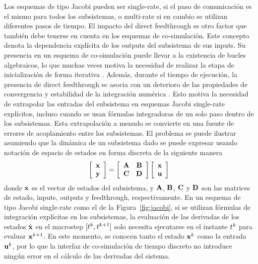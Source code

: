 Los esquemas de tipo Jacobi pueden ser single-rate, si el paso de comunicación es el mismo para todos los subsistemas, o multi-rate si en cambio se utilizan diferentes pasos de tiempo.
El impacto del direct feedthrough es otro factor que también debe tenerse en cuenta en los esquemas de co-simulación.
Este concepto denota la dependencia explícita de los outputs del subsistema de sus inputs.
Su presencia en un esquema de co-simulación puede llevar a la existencia de bucles algebraicos, lo que muchas veces motiva la necesidad de realizar la etapa de inicialización de forma iterativa \cite{Andersson2016}.
Además, durante el tiempo de ejecución, la presencia de direct feedthrough se asocia con un deterioro de las propiedades de convergencia y estabilidad de la integración numérica \cite{Arnold2013}.
Esto motiva la necesidad de extrapolar las entradas del subsistema en esquemas Jacobi single-rate explícitos, incluso cuando se usan fórmulas integradoras de un solo paso dentro de los subsistemas.
Esta extrapolación a menudo se convierte en una fuente de errores de acoplamiento entre los subsistemas.
El problema se puede ilustrar asumiendo que la dinámica de un subsistema dado se puede expresar usando notación de espacio de estados en forma discreta de la siguiente manera
%
\begin{equation}
	\sqbr{\matr{c}{\state \\ \outputs}} = \sqbr{\matr{cc}{\stateMatrix & \inputMatrix \\ \outputMatrix & \feedthrough}} \sqbr{\matr{c}{\state \\ \inputs}}
	\label{eq:statespace}
\end{equation}
%
donde $\mathbf{ x }$ es el vector de estados del subsistema, y $\mathbf{A}$, $\mathbf{B}$, $\mathbf{C}$ y $\mathbf{D}$ son las matrices de estado, inputs, outputs y feedthrough, respectivamente.
En un esquema de tipo Jacobi single-rate como el de la Figura~\ref{fig:jacobi}, si se utilizan fórmulas de integración explícitas en los subsistemas, la evaluación de las derivadas de los estados $\dot{\mathbf{ x }}$ en el macrostep $[t^{k}, t^{k + 1}]$ solo necesita ejecutarse en el instante $t^{k}$ para evaluar $\mathbf{ x }^{k + 1}$.
En este momento, se conocen tanto el estado $\mathbf{ x }^{k}$ como la entrada $\mathbf{u}^{k}$, por lo que la interfaz de co-simulación de tiempo discreto no introduce ningún error en el cálculo de las derivadas del sistema.

